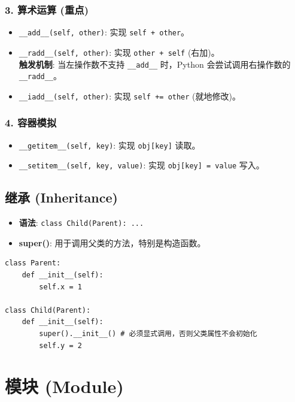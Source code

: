 \documentclass[12pt, a4paper]{article}
\begin{document}
\subsubsection{3. 算术运算 (重点)}
\begin{itemize}
    \item \texttt{\_\_add\_\_(self, other)}: 实现 \texttt{self + other}。
    \item \texttt{\_\_radd\_\_(self, other)}: 实现 \texttt{other + self} (右加)。
    \\ \textbf{触发机制}: 当左操作数不支持 \texttt{\_\_add\_\_} 时，Python 会尝试调用右操作数的 \texttt{\_\_radd\_\_}。
    \item \texttt{\_\_iadd\_\_(self, other)}: 实现 \texttt{self += other} (就地修改)。
\end{itemize}

\subsubsection{4. 容器模拟}
\begin{itemize}
    \item \texttt{\_\_getitem\_\_(self, key)}: 实现 \texttt{obj[key]} 读取。
    \item \texttt{\_\_setitem\_\_(self, key, value)}: 实现 \texttt{obj[key] = value} 写入。
\end{itemize}

\subsection{继承 (Inheritance)}

\begin{itemize}
    \item \textbf{语法}: \texttt{class Child(Parent): ...}
    \item \textbf{super()}: 用于调用父类的方法，特别是构造函数。
\end{itemize}
\begin{lstlisting}
class Parent:
    def __init__(self):
        self.x = 1

class Child(Parent):
    def __init__(self):
        super().__init__() # 必须显式调用，否则父类属性不会初始化
        self.y = 2
\end{lstlisting}

\section{模块 (Module)}
\end{document}
